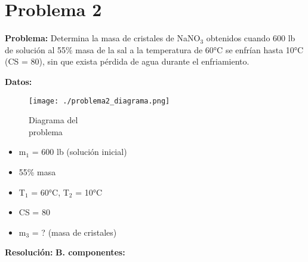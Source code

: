 \documentclass{article} %
\begin{document}
\section*{Problema 2} %
\textbf{Problema:}
Determina la masa de cristales de NaNO$_3$ obtenidos cuando 600 lb de solución al 55\% masa de la sal a la temperatura de 60°C se enfrían hasta 10°C (CS = 80), sin que exista pérdida de agua durante el enfriamiento.
\begin{multicols}{2} %
\noindent\textbf{} %

\textbf{Datos:} %

\begin{figure}[H]
    \begin{minipage}[t]{0.3\textwidth} %
        \raggedright %
        \texttt{[image: ./problema2\_diagrama.png]} %
        \caption{Diagrama del \\ problema}
    \end{minipage}
\end{figure}

\textbf{} %
\begin{itemize}
\item m$_1$ = 600 lb (solución inicial)
\item 55\% masa 
\item T$_1$ = 60°C, T$_2$ = 10°C
\item CS = 80
\item m$_3$ = ? (masa de cristales)
\end{itemize}

\columnbreak %

\noindent\textbf{} %

\textbf{Resolución:} %
\textbf{B. componentes:}


\end{multicols}
\end{document}
